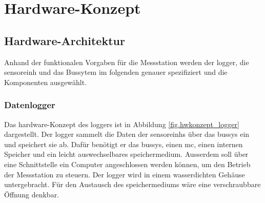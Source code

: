 %
%

\chapter{Hardware-Konzept}\label{chap.hardware}


\section{Hardware-Architektur}\label{sec.hw_arch}

Anhand der funktionalen Vorgaben für die Messstation werden der \gls{logger}, die \gls{sensoreinh} und das Bussytem im folgenden genauer spezifiziert und die Komponenten ausgewählt.

\subsection{Datenlogger}
Das \gls{hardware}-Konzept des \gls{logger}s ist in Abbildung \ref{fig.hwkonzept_logger} dargestellt.
Der \gls{logger} sammelt die Daten der \glspl{sensoreinh} über das \gls{bussys} ein und speichert sie ab. Dafür benötigt er das \gls{bussys}, einen \gls{mc}, einen internen Speicher und ein leicht auswechselbares \gls{speichermedium}. Ausserdem soll über eine Schnittstelle ein Computer angeschlossen werden können, um den Betrieb der Messstation zu steuern. Der \gls{logger} wird in einem wasserdichten Gehäuse untergebracht. Für den Austausch des \gls{speichermedium}s wäre eine verschraubbare Öffnung denkbar.

